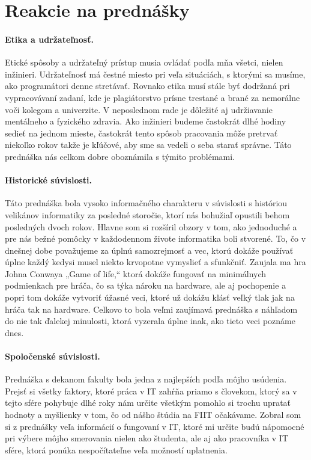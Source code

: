 \documentclass[10pt,twoside,slovak,a4paper]{article}										%
\begin{document}
\section{Reakcie na prednášky}

\paragraph{Etika a udržateľnosť. } 
Etické spôsoby a udržateľný prístup musia ovládať podľa mňa všetci, nielen inžinieri. Udržateľnosť má čestné miesto pri veľa situáciách, s ktorými sa musíme, ako programátori denne stretávať. Rovnako etika musí stále byť dodržaná pri vypracovávaní zadaní, kde je plagiátorstvo prísne trestané a brané za nemorálne voči kolegom a univerzite. V neposlednom rade je dôležité aj udržiavanie mentálneho a fyzického zdravia. Ako inžinieri budeme častokrát dlhé hodiny sedieť na jednom mieste, častokrát tento spôsob pracovania môže pretrvať niekoľko rokov takže je kľúčové, aby sme sa vedeli o seba starať správne. Táto prednáška nás celkom dobre oboznámila s týmito problémami.~\cite{etics:zdroj}

\paragraph{Historické súvislosti.} 
Táto prednáška bola vysoko informačného charakteru v súvislosti s históriou velikánov informatiky za posledné storočie, ktorí nás bohužiaľ opustili behom posledných dvoch rokov. Hlavne som si rozšíril obzory v tom, ako jednoduché a pre nás bežné pomôcky v každodennom živote informatika boli stvorené. To, čo v dnešnej dobe považujeme za úplnú samozrejmosť a vec, ktorú dokáže používať úplne každý kedysi musel niekto krvopotne vymyslieť a sfunkčniť. Zaujala ma hra Johna Conwaya „Game of life,“ ktorá dokáže fungovať na minimálnych podmienkach pre hráča, čo sa týka nároku na hardware, ale aj pochopenie a popri tom dokáže vytvoriť úžasné veci, ktoré už dokážu klásť veľký tlak jak na hráča tak na hardware. Celkovo to bola veľmi zaujímavá prednáška s náhľadom do nie tak ďalekej minulosti, ktorá vyzerala úplne inak, ako tieto veci poznáme dnes. ~\cite{sedem:zdroj}

\paragraph{Spoločenské súvislosti.} 
Prednáška s dekanom fakulty bola jedna z najlepších podľa môjho usúdenia. Prejsť si všetky faktory, ktoré práca v IT zahŕňa priamo s človekom, ktorý sa v tejto sfére pohybuje dlhé roky nám určite všetkým pomohlo si trochu upratať hodnoty a myšlienky v tom, čo od nášho štúdia na FIIT očakávame. Zobral som si z prednášky veľa informácií o fungovaní v IT, ktoré mi určite budú nápomocné pri výbere môjho smerovania nielen ako študenta, ale aj ako pracovníka v IT sfére, ktorá ponúka nespočítateľne veľa možností uplatnenia.~\cite{naco:zdroj}
\end{document}
